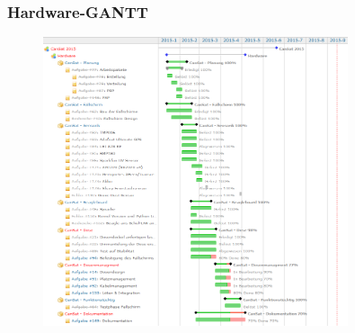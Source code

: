 \subsubsection {Hardware-GANTT}
\begin{figure}[htbp]
	\centering
	\includegraphics[trim = 2mm 2mm 2mm 2mm, clip,width=0.8\textwidth]{8_Anhang/hardware-gantt-1.png}
	\label{gantt_hardware_1}
\end{figure}
\vspace{-2cm}

\newpage

